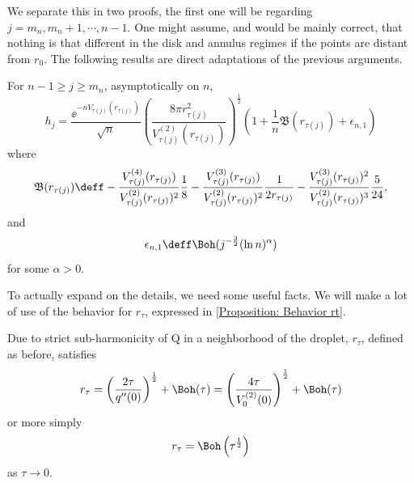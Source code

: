 We separate this in two proofs, the first one will be regarding $j = m_n, m_n + 1, \cdots, n-1$. One might assume, and would be mainly correct, that nothing is that different in the disk and annulus regimes if the points are distant from $r_0$. The following results are direct adaptations of the previous arguments. 

\begin{teorema}	\label{Theorem: hj disk j>mn}
	For $n-1 \geq j \geq m_n$, asymptotically on $n$,
	\begin{equation}
		h_j =  \frac{\ee^{-n V_{\tau(j)}(r_{\tau(j)})}}{\sqrt{n}} \left( \frac{8\pi r^2_{\tau(j)}}{V^{(2)}_{\tau(j)}(r_{\tau(j)})} \right)^{\frac{1}{2}} \left( 1 + \frac{1}{n} \mathfrak{B}(r_{\tau(j)}) + \epsilon_{n, 1} \right) 
	\end{equation}
	where 
	\begin{equation}
		\mathfrak{B}(r_{\tau(j)}) \deff -\frac{V^{(4)}_{\tau(j)}(r_{\tau(j)})}{V^{(2)}_{\tau(j)}(r_{\tau(j)})^2} \frac{1}{8} - \frac{V^{(3)}_{\tau(j)}(r_{\tau(j)})}{V^{(2)}_{\tau(j)}(r_{\tau(j)})^{2}} \frac{1}{2 r_{\tau(j)}} - \frac{V^{(3)}_{\tau(j)}(r_{\tau(j)})^2}{V^{(2)}_{\tau(j)}(r_{\tau(j)})^{3}} \frac{5}{24},
	\end{equation}
	and
	\begin{equation}
		\epsilon_{n, 1} \deff  \Boh(j^{-\frac{3}{2}} (\ln n)^\alpha)
	\end{equation}
	for some $\alpha > 0$.
\end{teorema}

To actually expand on the details, we need some useful facts. We will make a lot of use of the behavior for $r_\tau$, expressed in \autoref{Proposition: Behavior rt}.

\begin{proposicao} 	\label{Proposition: Behavior rt}
	Due to strict sub-harmonicity of Q in a neighborhood of the droplet, $r_\tau$, defined as before, satisfies 
	\begin{equation}
		r_\tau = \left( \frac{2\tau}{q''(0)} \right)^{\frac{1}{2}} + \Boh(\tau) = \left( \frac{4\tau}{V^{(2)}_0(0)} \right)^{\frac{1}{2}} + \Boh(\tau) 
	\end{equation}
	or more simply
	\begin{equation}
		r_\tau = \Boh \left(\tau^{\frac{1}{2}}\right)
	\end{equation}
	as $\tau \rightarrow 0$.
\end{proposicao}

